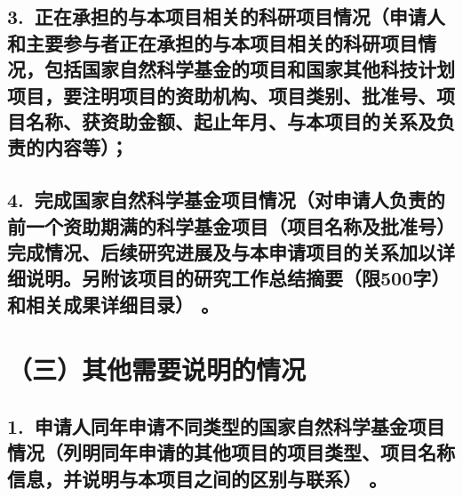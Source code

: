 \documentclass[12pt,UTF8,AutoFakeBold=2.5,a4paper]{ctexart} %
\begin{document}
\subsection{\hspace{1.45em}  3.~{\bfseries 正在承担的与本项目相关的科研项目情况}（申请人和主要参与者正在承担的与本项目相关的科研项目情况，包括国家自然科学基金的项目和国家其他科技计划项目，要注明项目的资助机构、项目类别、批准号、项目名称、获资助金额、起止年月、\hspace{-4pt}与本项目的关系及负责的内容等）；\hspace{-14pt} }




\subsection{\hspace{1.45em}  4.~{\bfseries 完成国家自然科学基金项目情况}（对申请人负责的前一个资助期满的科学基金项目（项目名称及批准号）完成情况、后续研究进展及与本申请项目的关系加以详细说明。另附该项目的研究工作总结摘要（限500字）和相关成果详细目录）\hspace{-14pt} 。}




\section{{\bfseries （三）其他需要说明的情况}} %
\subsection{\hspace{1.45em}  1.~申请人同年申请不同类型的国家自然科学基金项目情况（列明同年申请的其他项目的项目类型、项目名称信息，并说明与本项目之间的区别与联系）\hspace{-14pt} 。}
\end{document}
